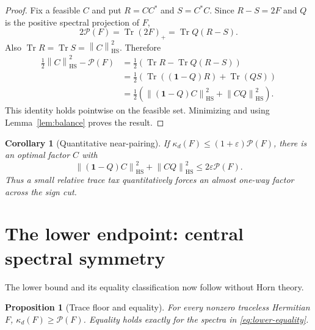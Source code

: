 \documentclass[11pt]{article}
\newtheorem{proposition}[theorem]{Proposition}
\newtheorem{corollary}[theorem]{Corollary}
\theoremstyle{definition}
\theoremstyle{remark}
\newcommand{\Tr}{\operatorname{Tr}}
\newcommand{\1}{\mathbf 1}
\newcommand{\norm}[1]{\left\lVert #1\right\rVert}
\newcommand{\HS}{\mathrm{HS}}
\newcommand{\PP}{\mathcal P}
\begin{document}
\begin{proof}
Fix a feasible $C$ and put $R=CC^*$ and $S=C^*C$.  Since $R-S=2F$ and $Q$ is the positive spectral projection of $F$,
\[
 2\PP(F)=\Tr(2F)_+=\Tr Q(R-S).
\]
Also $\Tr R=\Tr S=\norm C_{\HS}^2$.  Therefore
\begin{align}
 \frac12\norm C_{\HS}^2-\PP(F)
 &=\frac12\left(\Tr R-\Tr Q(R-S)\right)\nonumber\\
 &=\frac12\left(\Tr((\1-Q)R)+\Tr(QS)\right)\nonumber\\
 &=\frac12\left(\norm{(\1-Q)C}_{\HS}^2+\norm{CQ}_{\HS}^2\right).
 \label{eq:pointwise-leakage}
\end{align}
This identity holds pointwise on the feasible set.  Minimizing and using Lemma~\ref{lem:balance} proves the result.
\end{proof}

\begin{corollary}[Quantitative near-pairing]
\label{cor:stability}
If $\kappa_d(F)\le(1+\varepsilon)\PP(F)$, there is an optimal factor $C$ with
\[
 \norm{(\1-Q)C}_{\HS}^2+\norm{CQ}_{\HS}^2
 \le2\varepsilon\PP(F).
\]
Thus a small relative trace tax quantitatively forces an almost one-way factor across the sign cut.
\end{corollary}

\section{The lower endpoint: central spectral symmetry}

The lower bound and its equality classification now follow without Horn theory.

\begin{proposition}[Trace floor and equality]
\label{prop:lower}
For every nonzero traceless Hermitian $F$, $\kappa_d(F)\ge\PP(F)$.  Equality holds exactly for the spectra in \eqref{eq:lower-equality}.
\end{proposition}
\end{document}
